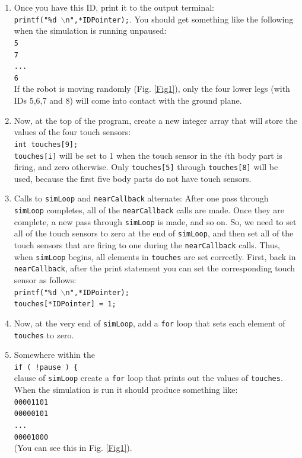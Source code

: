 \documentclass[12pt]{article}
\begin{document}
\begin{enumerate}
\item Once you have this ID, print it to the output terminal:\\
    \texttt{printf("\%d $\backslash$n",*IDPointer);}. You should get something like the following when the simulation is running unpaused:\\
    \texttt{5}\\
    \texttt{7}\\
    \texttt{...}\\
    \texttt{6}\\
    If the robot is moving randomly (Fig. \ref{Fig1}), only the four lower legs (with IDs 5,6,7 and 8) will come into contact with the ground plane.

\item Now, at the top of the program, create a new integer array that will store the values of the four touch sensors:\\
    \texttt{int touches[9];} \\
    \texttt{touches[i]} will be set to 1 when the touch sensor in the $i$th body part is firing, and zero otherwise. Only \texttt{touches[5]} through \texttt{touches[8]} will be used, because the first five body parts do not have touch sensors.

\newpage

\item Calls to \texttt{simLoop} and \texttt{nearCallback} alternate: After one pass through \texttt{simLoop} completes, all of the \texttt{nearCallback} calls are made. Once they are complete, a new pass through \texttt{simLoop} is made, and so on. So, we need to set all of the touch sensors to zero at the end of \texttt{simLoop}, and then set all of the touch sensors that are firing to one during the \texttt{nearCallback} calls. Thus, when \texttt{simLoop} begins, all elements in \texttt{touches} are set correctly. First, back in \texttt{nearCallback}, after the print statement you can set the corresponding touch sensor as follows:\\
    \texttt{printf("\%d $\backslash$n",*IDPointer);}\\
    \texttt{touches[*IDPointer] = 1;}

\item Now, at the very end of \texttt{simLoop}, add a \texttt{for} loop that sets each element of \texttt{touches} to zero.

\item Somewhere within the \\
    \texttt{if ( !pause ) \{}\\
    clause of \texttt{simLoop} create a \texttt{for} loop that prints out the values of \texttt{touches}. When the simulation is run it should produce something like: \\
    \texttt{00001101}\\
    \texttt{00000101}\\
    \texttt{...}\\
    \texttt{00001000}\\
    (You can see this in Fig. \ref{Fig1}).


\end{enumerate}
\end{document}
